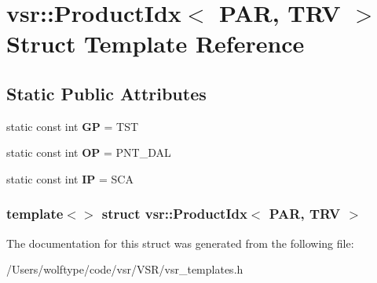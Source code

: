 \hypertarget{structvsr_1_1_product_idx_3_01_p_a_r_00_01_t_r_v_01_4}{\section{vsr\-:\-:Product\-Idx$<$ P\-A\-R, T\-R\-V $>$ Struct Template Reference}
\label{structvsr_1_1_product_idx_3_01_p_a_r_00_01_t_r_v_01_4}
}
\subsection*{Static Public Attributes}
\begin{DoxyCompactItemize}
\item 
\hypertarget{structvsr_1_1_product_idx_3_01_p_a_r_00_01_t_r_v_01_4_a9ff1a28e160bedb54ec85dc5816a4495}{static const int {\bfseries G\-P} = T\-S\-T}\label{structvsr_1_1_product_idx_3_01_p_a_r_00_01_t_r_v_01_4_a9ff1a28e160bedb54ec85dc5816a4495}

\item 
\hypertarget{structvsr_1_1_product_idx_3_01_p_a_r_00_01_t_r_v_01_4_ad83f69496f6ccbeca52b192c2f8d55a4}{static const int {\bfseries O\-P} = P\-N\-T\-\_\-\-D\-A\-L}\label{structvsr_1_1_product_idx_3_01_p_a_r_00_01_t_r_v_01_4_ad83f69496f6ccbeca52b192c2f8d55a4}

\item 
\hypertarget{structvsr_1_1_product_idx_3_01_p_a_r_00_01_t_r_v_01_4_ade32d5fe4b213cf968b4b881de5b3cbd}{static const int {\bfseries I\-P} = S\-C\-A}\label{structvsr_1_1_product_idx_3_01_p_a_r_00_01_t_r_v_01_4_ade32d5fe4b213cf968b4b881de5b3cbd}

\end{DoxyCompactItemize}
\subsubsection*{template$<$$>$ struct vsr\-::\-Product\-Idx$<$ P\-A\-R, T\-R\-V $>$}



The documentation for this struct was generated from the following file\-:\begin{DoxyCompactItemize}
\item 
/\-Users/wolftype/code/vsr/\-V\-S\-R/vsr\-\_\-templates.\-h\end{DoxyCompactItemize}
